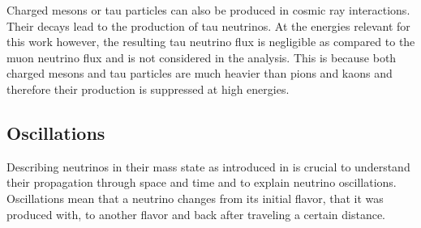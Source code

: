Charged mesons or tau particles can also be produced in cosmic ray interactions. Their decays lead to the production of tau neutrinos. At the energies relevant for this work however, the resulting tau neutrino flux is negligible as compared to the muon neutrino flux  and is not considered in the analysis. This is because both charged mesons and tau particles are much heavier than pions and kaons and therefore their production is suppressed at high energies.


\subsection{Oscillations} 

Describing neutrinos in their mass state as introduced in  is crucial to understand their propagation through space and time and to explain neutrino oscillations. Oscillations mean that a neutrino changes from its initial flavor, that it was produced with, to another flavor and back after traveling a certain distance.

